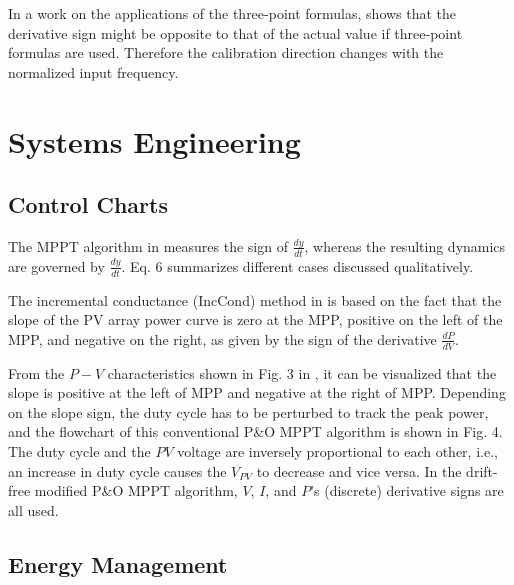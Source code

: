 \documentclass[11pt]{book}
\begin{document}
In a work on the applications of the three-point formulas, \cite{yin2020background} shows that the derivative sign might be opposite
to that of the actual value if three-point formulas are used. Therefore
the calibration direction changes with the normalized input frequency.


\section{Systems Engineering}


\subsection{Control Charts}

The MPPT algorithm in \cite{leyva2006mppt} measures the sign of $\frac{dy}{dt}$,
whereas the resulting dynamics are governed by $\frac{dy}{dt}$. Eq.
6 summarizes different cases discussed qualitatively.

The incremental conductance (IncCond) method in \cite{esram2007comparison}
is based on the fact that the slope of the PV array power curve is
zero at the MPP, positive on the left of the MPP, and negative on
the right, as given by the sign of the derivative $\frac{dP}{dV}$.

From the $P-V$ characteristics shown in Fig. 3 in \cite{killi2015modified},
it can be visualized that the slope is positive at the left of MPP
and negative at the right of MPP. Depending on the slope sign, the
duty cycle has to be perturbed to track the peak power, and the flowchart
of this conventional P\&O MPPT algorithm is shown in Fig. 4. The duty
cycle and the $PV$ voltage are inversely proportional to each other,
i.e., an increase in duty cycle causes the $V_{PV}$ to decrease and
vice versa. In the drift-free modified P\&O MPPT algorithm, $V$,
$I$, and $P$'s (discrete) derivative signs are all used.


\subsection{Energy Management}
\end{document}

